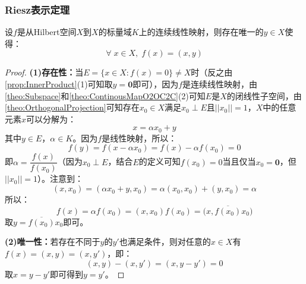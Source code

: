 \subsubsection{Riesz表示定理}
\begin{theorem}\label{theo:RieszRepresentation}
	设$f$是从Hilbert空间$X$到$X$的标量域$K$上的连续线性映射，则存在唯一的$y\in X$使得：
	\begin{equation*}
		\forall\;x\in X,\;f(x)=(x,y)
	\end{equation*}
\end{theorem}
\begin{proof}
	\textbf{(1)存在性：}当$E=\{x\in X:f(x)=0\}\ne X$时（反之由\cref{prop:InnerProduct}(1)可知取$y=\mathbf{0}$即可），因为$f$是连续线性映射，由\cref{theo:Subspace}和\cref{theo:ContinousMapO2OC2C}(2)可知$E$是$X$的闭线性子空间，由\cref{theo:OrthogonalProjection}可知存在$x_0\in X$满足$x_0\perp E$且$||x_0||=1$，$X$中的任意元素$x$可以分解为：
	\begin{equation*}
		x=\alpha x_0+y
	\end{equation*}
	其中$y\in E$，$\alpha\in K$。因为$f$是线性映射，所以：
	\begin{equation*}
		f(y)=f(x-\alpha x_0)=f(x)-\alpha f(x_0)=0
	\end{equation*}
	即$\alpha=\dfrac{f(x)}{f(x_0)}$（因为$x_0\perp E$，结合$E$的定义可知$f(x_0)=0$当且仅当$x_0=\mathbf{0}$，但$||x_0||=1$）。注意到：
	\begin{equation*}
		(x,x_0)=(\alpha x_0+y,x_0)=\alpha(x_0,x_0)+(y,x_0)=\alpha
	\end{equation*}
	所以：
	\begin{equation*}
		f(x)=\alpha f(x_0)=(x,x_0)f(x_0)=\Big(x,\overline{f(x_0)}x_0\Big)
	\end{equation*}
	取$y=\overline{f(x_0)}x_0$即可。\par
	\textbf{(2)唯一性：}若存在不同于$y$的$y'$也满足条件，则对任意的$x\in X$有$f(x)=(x,y)=(x,y')$，即：
	\begin{equation*}
		(x,y)-(x,y')=(x,y-y')=0
	\end{equation*}
	取$x=y-y'$即可得到$y=y'$。
\end{proof}
